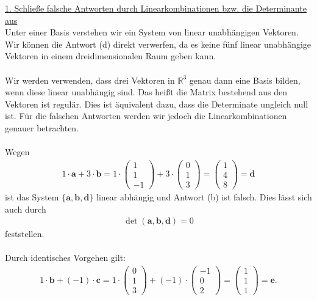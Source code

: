\underline{1. Schließe falsche Antworten durch Linearkombinationen bzw. die Determinante aus}\\
Unter einer Basis verstehen wir ein System von linear unabhängigen Vektoren.
Wir können die Antwort (d) direkt verwerfen, da es keine fünf linear unabhängige Vektoren in einem dreidimensionalen Raum geben kann.\\
\\
Wir werden verwenden, dass drei Vektoren in $ \mathbb{R}^3 $ genau dann eine Basis bilden, wenn diese linear unabhängig sind.
Das heißt die Matrix bestehend aus den Vektoren ist regulär. Dies ist äquivalent dazu, dass die Determinate ungleich null ist.
Für die falschen Antworten werden wir jedoch die Linearkombinationen genauer betrachten.\\
\\
Wegen
\begin{align*}
1 \cdot  \textbf{a} + 3 \cdot \textbf{b}
=
1 \cdot \begin{pmatrix}
1 \\ 1 \\ -1
\end{pmatrix}
+ 3 \cdot
\begin{pmatrix}
0 \\ 1 \\ 3
\end{pmatrix}
=
\begin{pmatrix}
1 \\ 4 \\ 8
\end{pmatrix} =\textbf{d}
\end{align*}
ist das System $ \lbrace \textbf{a}, \textbf{b} , \textbf{d} \rbrace  $ linear abhängig und Antwort (b) ist falsch.
Dies lässt sich auch durch
\begin{align*}
\det(\textbf{a}, \textbf{b}, \textbf{d} ) = 0
\end{align*}
feststellen.\\
\\
Durch identisches Vorgehen gilt:
\begin{align*}
1 \cdot \textbf{b} + (-1) \cdot \textbf{c} = 
1 \cdot \begin{pmatrix}
0 \\ 1 \\3
\end{pmatrix}
+ (-1) \cdot 
\begin{pmatrix}
-1 \\ 0 \\ 2
\end{pmatrix}
=
\begin{pmatrix}
1 \\ 1 \\ 1
\end{pmatrix}
= \textbf{e}.
\end{align*}
